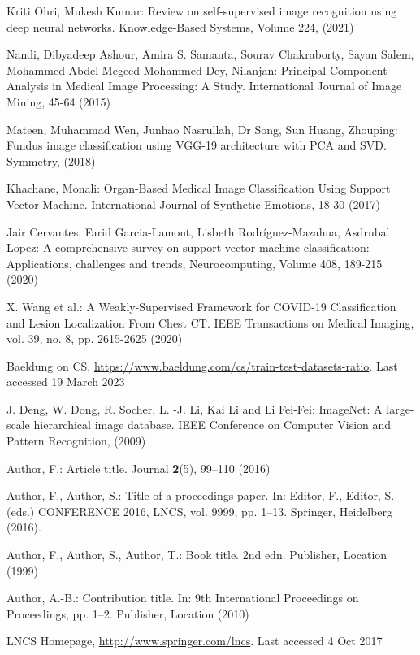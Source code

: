 \begin{thebibliography}{99.}
Kriti Ohri, Mukesh Kumar: Review on self-supervised image recognition using deep neural networks. Knowledge-Based Systems, Volume 224, (2021)

Nandi, Dibyadeep Ashour, Amira S. Samanta, Sourav Chakraborty, Sayan Salem, Mohammed Abdel-Megeed Mohammed Dey, Nilanjan: Principal Component Analysis in Medical Image Processing: A Study. International Journal of Image Mining, 45-64 (2015)

Mateen, Muhammad Wen, Junhao Nasrullah, Dr Song, Sun Huang, Zhouping: Fundus image classification using VGG-19 architecture with PCA and SVD. Symmetry, (2018)

Khachane, Monali: Organ-Based Medical Image Classification Using Support Vector Machine. International Journal of Synthetic Emotions, 18-30 (2017)

Jair Cervantes, Farid Garcia-Lamont, Lisbeth Rodríguez-Mazahua, Asdrubal Lopez: A comprehensive survey on support vector machine classification: Applications, challenges and trends,
Neurocomputing, Volume 408, 189-215 (2020)

X. Wang et al.: A Weakly-Supervised Framework for COVID-19 Classification and Lesion Localization From Chest CT. IEEE Transactions on Medical Imaging, vol. 39, no. 8, pp. 2615-2625 (2020)

Baeldung on CS, \url{https://www.baeldung.com/cs/train-test-datasets-ratio}. Last accessed 19
March 2023

J. Deng, W. Dong, R. Socher, L. -J. Li, Kai Li and Li Fei-Fei: ImageNet: A large-scale hierarchical image database. IEEE Conference on Computer Vision and Pattern Recognition, (2009)


Author, F.: Article title. Journal \textbf{2}(5), 99--110 (2016)

Author, F., Author, S.: Title of a proceedings paper. In: Editor,
F., Editor, S. (eds.) CONFERENCE 2016, LNCS, vol. 9999, pp. 1--13.
Springer, Heidelberg (2016). 

Author, F., Author, S., Author, T.: Book title. 2nd edn. Publisher,
Location (1999)

Author, A.-B.: Contribution title. In: 9th International Proceedings
on Proceedings, pp. 1--2. Publisher, Location (2010)

LNCS Homepage, \url{http://www.springer.com/lncs}. Last accessed 4
Oct 2017

\end{thebibliography}